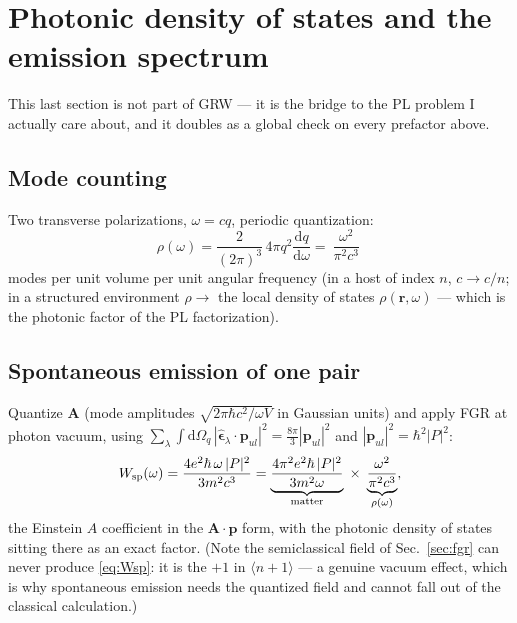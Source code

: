 \documentclass[11pt,a4paper]{article}
\numberwithin{equation}{section}
\newcommand{\dd}{\mathrm{d}}
\begin{document}
\section{Photonic density of states and the emission spectrum}
\label{sec:photonic}

This last section is not part of GRW --- it is the bridge to the PL
problem I actually care about, and it doubles as a global check on
every prefactor above.

\subsection{Mode counting}

Two transverse polarizations, $\omega=cq$, periodic quantization:
\begin{equation}
\rho(\omega)=\frac{2}{(2\pi)^3}\,4\pi q^2\frac{\dd q}{\dd\omega}
=\boxed{\ \frac{\omega^2}{\pi^2c^3}\ }
\label{eq:rho}
\end{equation}
modes per unit volume per unit angular frequency (in a host of index
$n$, $c\to c/n$; in a structured environment $\rho\to$ the local
density of states $\rho(\mathbf r,\omega)$ --- which is the photonic
factor of the PL factorization).

\subsection{Spontaneous emission of one pair}

Quantize $\mathbf A$ (mode amplitudes $\sqrt{2\pi\hbar c^2/\omega V}$
in Gaussian units) and apply FGR at photon vacuum, using
$\sum_\lambda\int\dd\Omega_q\,
|\hat{\bm\epsilon}_\lambda\!\cdot\!\mathbf p_{ul}|^2
=\tfrac{8\pi}{3}|\mathbf p_{ul}|^2$ and
$|\mathbf p_{ul}|^2=\hbar^2|P|^2$:
\begin{equation}
W_{\rm sp}(\omega)
=\frac{4e^2\hbar\,\omega\,|P|^2}{3m^2c^3}
=\underbrace{\frac{4\pi^2 e^2\hbar\,|P|^2}{3m^2\omega}}_{\text{matter}}
\;\times\;
\underbrace{\frac{\omega^2}{\pi^2c^3}}_{\rho(\omega)} ,
\label{eq:Wsp}
\end{equation}
the Einstein $A$ coefficient in the $\mathbf A\!\cdot\!\mathbf p$
form, with the photonic density of states sitting there as an exact
factor. (Note the semiclassical field of Sec.~\ref{sec:fgr} can never
produce \eqref{eq:Wsp}: it is the $+1$ in $\langle n+1\rangle$ ---
a genuine vacuum effect, which is why spontaneous emission needs the
quantized field and cannot fall out of the classical calculation.)
\end{document}

